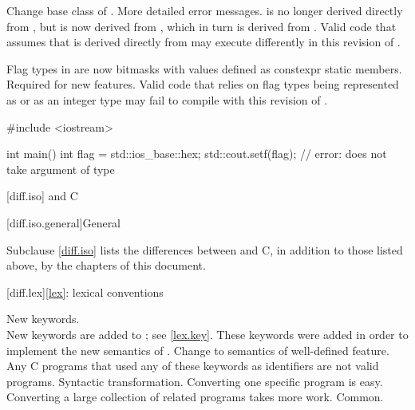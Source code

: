 \change
Change base class of .
\rationale
More detailed error messages.
\effect
{} is no longer derived directly from
, but is now derived from ,
which in turn is derived from . Valid \CppIII{} code
that assumes that  is derived directly from
 may execute differently in this revision of \Cpp{}.

\change
Flag types in  are now bitmasks with values
defined as constexpr static members.
\rationale
Required for new features.
\effect
Valid \CppIII{} code that relies on  flag types being
represented as  or as an integer type may fail to compile
with this revision of \Cpp{}.
\begin{example}
\begin{codeblock}
#include <iostream>

int main() {
  int flag = std::ios_base::hex;
  std::cout.setf(flag);         // error:  does not take argument of type 
}
\end{codeblock}
\end{example}

[diff.iso]{\Cpp{} and C}

[diff.iso.general]{General}

\pnum
{}%
Subclause \ref{diff.iso} lists the differences between \Cpp{} and C,
in addition to those listed above,
by the chapters of this document.

[diff.lex]{\ref*{lex}: lexical conventions}

\change
New keywords.\\
New keywords are added to \Cpp{};
see \ref{lex.key}.
\rationale
These keywords were added in order to implement the new
semantics of \Cpp{}.
\effect
Change to semantics of well-defined feature.
Any C programs that used any of these keywords as identifiers
are not valid \Cpp{} programs.
\difficulty
Syntactic transformation.
Converting one specific program is easy.
Converting a large collection
of related programs takes more work.
\howwide
Common.

